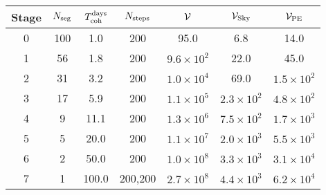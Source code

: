 \begin{tabular}{c|cccccc}
Stage & $N_{\rm seg}$ & $T_{\rm coh}^{\rm days}$ &$N_{\rm steps}$ & $\mathcal{V}$ & $\mathcal{V}_{\rm Sky}$ & $\mathcal{V}_{\rm PE}$ \\ \hline
0 & 100 & 1.0 & 200 & 95.0 & 6.8 & 14.0 \\
1 & 56 & 1.8 & 200 & $9.6{\times}10^{2}$ & 22.0 & 45.0 \\
2 & 31 & 3.2 & 200 & $1.0{\times}10^{4}$ & 69.0 & $1.5{\times}10^{2}$ \\
3 & 17 & 5.9 & 200 & $1.1{\times}10^{5}$ & $2.3{\times}10^{2}$ & $4.8{\times}10^{2}$ \\
4 & 9 & 11.1 & 200 & $1.3{\times}10^{6}$ & $7.5{\times}10^{2}$ & $1.7{\times}10^{3}$ \\
5 & 5 & 20.0 & 200 & $1.1{\times}10^{7}$ & $2.0{\times}10^{3}$ & $5.5{\times}10^{3}$ \\
6 & 2 & 50.0 & 200 & $1.0{\times}10^{8}$ & $3.3{\times}10^{3}$ & $3.1{\times}10^{4}$ \\
7 & 1 & 100.0 & 200,200 & $2.7{\times}10^{8}$ & $4.4{\times}10^{3}$ & $6.2{\times}10^{4}$ \\
\end{tabular}
